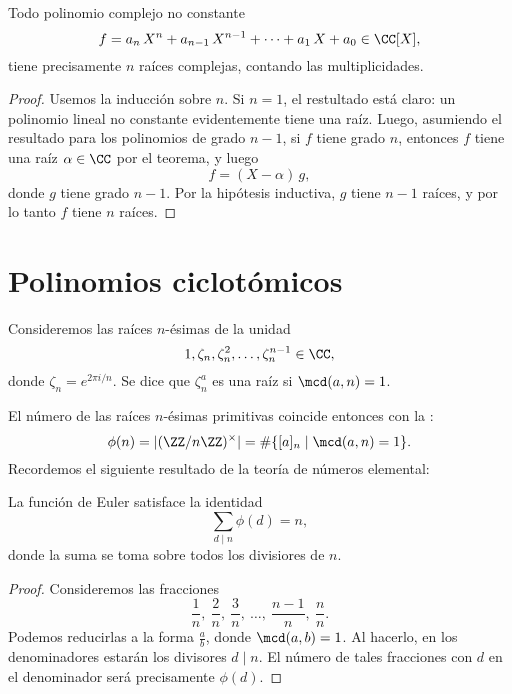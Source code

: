 \begin{corolario}
  Todo polinomio complejo no constante
  $$f = a_n\,X^n + a_{n-1}\,X^{n-1} + \cdots + a_1\,X + a_0 \in \CC [X],$$
  tiene precisamente $n$ raíces complejas, contando las multiplicidades.

  \begin{proof}
    Usemos la inducción sobre $n$. Si $n = 1$, el restultado está claro:
    un polinomio lineal no constante evidentemente tiene una raíz. Luego,
    asumiendo el resultado para los polinomios de grado $n-1$, si $f$ tiene
    grado $n$, entonces $f$ tiene una raíz $\alpha \in \CC$ por el teorema, y
    luego
    $$f = (X-\alpha)\,g,$$
    donde $g$ tiene grado $n-1$. Por la hipótesis inductiva, $g$ tiene $n-1$
    raíces, y por lo tanto $f$ tiene $n$ raíces.
  \end{proof}
\end{corolario}


\section{Polinomios ciclotómicos}

\begin{definicion}
  Consideremos las raíces $n$-ésimas de la unidad
  $$1, \zeta_n, \zeta_n^2, \ldots, \zeta_n^{n-1} \in \CC,$$
  donde $\zeta_n = e^{2\pi i/n}$. Se dice que $\zeta_n^a$ es una raíz
   si $\mcd (a,n) = 1$.
\end{definicion}

El número de las raíces $n$-ésimas primitivas coincide entonces con
la :
$$\phi (n) = |(\ZZ/n\ZZ)^\times| = \# \{ [a]_n \mid \mcd (a,n) = 1 \}.$$
Recordemos el siguiente resultado de la teoría de números elemental:

\begin{lema}
  La función de Euler satisface la identidad
  $$\sum_{d\mid n} \phi (d) = n,$$
  donde la suma se toma sobre todos los divisiores de $n$.

  \begin{proof}
    Consideremos las fracciones
    $$\frac{1}{n}, ~ \frac{2}{n}, ~ \frac{3}{n}, ~ \ldots, ~ \frac{n-1}{n}, ~ \frac{n}{n}.$$
    Podemos reducirlas a la forma $\frac{a}{b}$, donde $\mcd (a,b) = 1$.
    Al hacerlo, en los denominadores estarán los divisores $d\mid n$. El número
    de tales fracciones con $d$ en el denominador será precisamente $\phi (d)$.
  \end{proof}
\end{lema}

